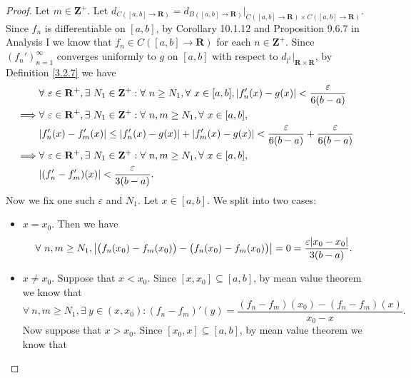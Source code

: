 \begin{proof}
    Let \(m \in \mathbf{Z}^+\).
    Let \(d_{C([a, b] \to \mathbf{R})} = d_{B([a, b] \to \mathbf{R})}|_{C([a, b] \to \mathbf{R}) \times C([a, b] \to \mathbf{R})}\).
    Since \(f_n\) is differentiable on \([a, b]\), by Corollary 10.1.12 and Proposition 9.6.7 in Analysis I we know that \(f_n \in C([a, b] \to \mathbf{R})\) for each \(n \in \mathbf{Z}^+\).
    Since \((f_n')_{n = 1}^\infty\) converges uniformly to \(g\) on \([a, b]\) with respect to \(d_{l^1}|_{\mathbf{R} \times \mathbf{R}}\), by Definition \ref{3.2.7} we have
    \begin{align*}
                 & \forall\ \varepsilon \in \mathbf{R}^+, \exists\ N_1 \in \mathbf{Z}^+ : \forall\ n \geq N_1, \forall\ x \in [a, b], \abs*{f_n'(x) - g(x)} < \frac{\varepsilon}{6(b - a)} \\
        \implies & \forall\ \varepsilon \in \mathbf{R}^+, \exists\ N_1 \in \mathbf{Z}^+ : \forall\ n, m \geq N_1, \forall\ x \in [a, b],                                                   \\
                 & \abs*{f_n'(x) - f_m'(x)} \leq \abs*{f_n'(x) - g(x)} + \abs*{f_m'(x) - g(x)} < \frac{\varepsilon}{6(b - a)} + \frac{\varepsilon}{6(b - a)}                               \\
        \implies & \forall\ \varepsilon \in \mathbf{R}^+, \exists\ N_1 \in \mathbf{Z}^+ : \forall\ n, m \geq N_1, \forall\ x \in [a, b],                                                   \\
                 & \abs*{(f_n' - f_m')(x)} < \frac{\varepsilon}{3(b - a)}.
    \end{align*}
    Now we fix one such \(\varepsilon\) and \(N_1\).
    Let \(x \in [a, b]\).
    We split into two cases:
    \begin{itemize}
        \item \(x = x_0\).
              Then we have
              \[
                  \forall\ n, m \geq N_1, \abs*{\big(f_n(x_0) - f_m(x_0)\big) - \big(f_n(x_0) - f_m(x_0)\big)} = 0 = \frac{\varepsilon \abs*{x_0 - x_0}}{3(b - a)}.
              \]
        \item \(x \neq x_0\).
              Suppose that \(x < x_0\).
              Since \([x, x_0] \subseteq [a, b]\), by mean value theorem we know that
              \[
                  \forall\ n, m \geq N_1, \exists\ y \in (x, x_0) : (f_n - f_m)'(y) = \frac{(f_n - f_m)(x_0) - (f_n - f_m)(x)}{x_0 - x}.
              \]
              Now suppose that \(x > x_0\).
              Since \([x_0, x] \subseteq [a, b]\), by mean value theorem we know that

\end{itemize}
\end{proof}
